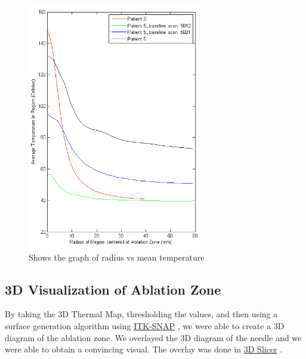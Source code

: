 \documentclass[]{spie}  %
\begin{document}
\begin{figure} 
\centering 
\includegraphics[width=3in]{meanTempVsRadiusFull.png} 
\caption{Shows the graph of radius vs mean temperature} 
\end{figure}


\subsection{3D Visualization of Ablation Zone}

By taking the 3D Thermal Map, thresholding the values, and then using a surface generation algorithm using \href{www.itksnap.org}{ITK-SNAP} \cite{Yushkevich06}, we were able to create a 3D diagram of the ablation zone. We overlayed the 3D diagram of the needle and we were able to obtain a convincing visual. The overlay was done in \href{http://www.slicer.org/}{3D Slicer} \cite{Fedorov12}. 
\end{document}
